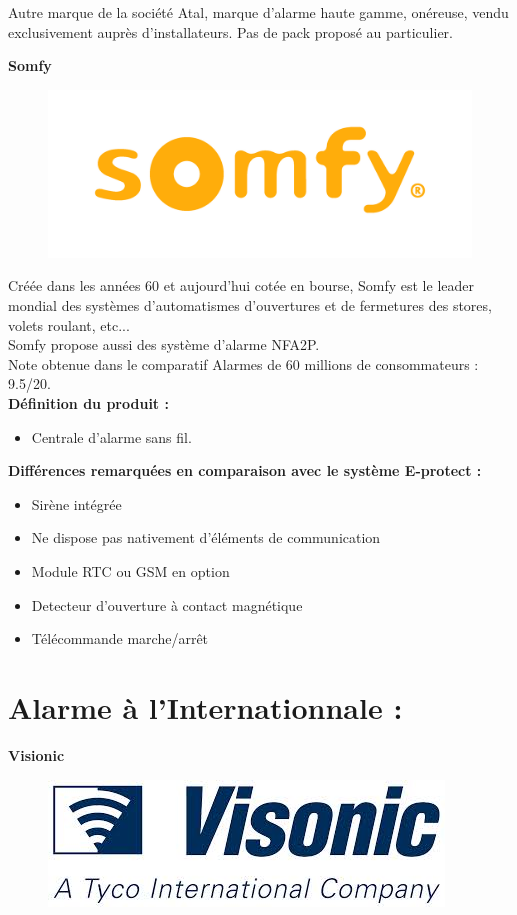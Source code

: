 Autre marque de la société Atal, marque d'alarme haute gamme, onéreuse, vendu exclusivement auprès d'installateurs. Pas de pack proposé au particulier.

\textbf{Somfy}\\
\begin{figure}[h!]
	\begin{center}
		\includegraphics[width=0.4\linewidth]{../images/Somfy}
	\end{center}
	\caption{\cite{www:Somfy}}
\end{figure}

Créée dans les années 60 et aujourd'hui cotée en bourse, Somfy est le leader mondial des systèmes d'automatismes d'ouvertures et de fermetures des stores, volets roulant, etc...\\
Somfy propose aussi des système d'alarme NFA2P.\\
Note obtenue dans le comparatif Alarmes de 60 millions de consommateurs : 9.5/20.\\

\textbf{Définition du produit :}
\begin{itemize}
\item Centrale d'alarme sans fil.
\end{itemize}

\textbf{Différences remarquées en comparaison avec le système E-protect :}
\begin{itemize}
\item Sirène intégrée
\item Ne dispose pas nativement d'éléments de communication
\item Module RTC ou GSM en option
\item Detecteur d'ouverture à contact magnétique
\item Télécommande marche/arrêt\\
\end{itemize}


\section{Alarme à l'Internationnale :}

\textbf{Visionic}\\
\begin{figure}[h!]
	\begin{center}
		\includegraphics[width=0.4\linewidth]{../images/visionic}
	\end{center}
	\caption{\cite{www:visionic}}
\end{figure}

